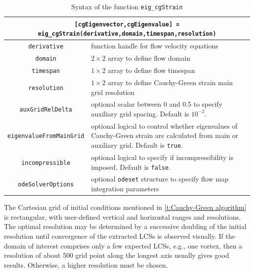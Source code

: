 \documentclass{article}
\begin{document}
\begin{table}
\begin{center}
\begin{tabular}{|c|p{}|}
\hline
\multicolumn{2}{|p{\textwidth}|}{\lstinline![cgEigenvector,cgEigenvalue] = eig_cgStrain(derivative,domain,timespan,resolution)!}\tabularnewline
\hline
\lstinline!derivative! & function handle for flow velocity equations\tabularnewline
\hline
\lstinline!domain! & $2 \times 2$ array to define flow domain\tabularnewline
\hline
\lstinline!timespan! & $1 \times 2$ array to define flow timespan\tabularnewline
\hline
\lstinline!resolution! & $1 \times 2$ array to define Cauchy-Green strain main grid resolution\tabularnewline
\hline
\lstinline!auxGridRelDelta! & optional scalar between 0 and 0.5 to specify auxiliary grid spacing. Default is $10^{-2}$.\tabularnewline
\hline
\lstinline!eigenvalueFromMainGrid! & optional logical to control whether eigenvalues of Cauchy-Green strain are calculated from main or auxiliary grid. Default is \lstinline!true!.\tabularnewline
\hline
\lstinline!incompressible! & optional logical to specify if incompressibility is imposed. Default is \lstinline!false!.\tabularnewline
\hline
\lstinline!odeSolverOptions! & optional \lstinline!odeset! structure to specify flow map integration parameters\tabularnewline
\hline
\end{tabular}
\caption{Syntax of the function \lstinline!eig_cgStrain!}
\label{t:eig_cgStrain syntax}
\end{center}
\end{table}


The Cartesian grid of initial conditions mentioned in \cref{t:Cauchy-Green algorithm} is rectangular, with user-defined vertical and horizontal ranges and resolutions. The optimal resolution may be determined by a successive doubling of the initial resolution until convergence of the extracted LCSs is observed visually. If the domain of interest comprises only a few expected LCSs, e.g., one vortex, then a resolution of about 500 grid point along the longest axis usually gives good results. Otherwise, a higher resolution must be chosen.
\end{document}
